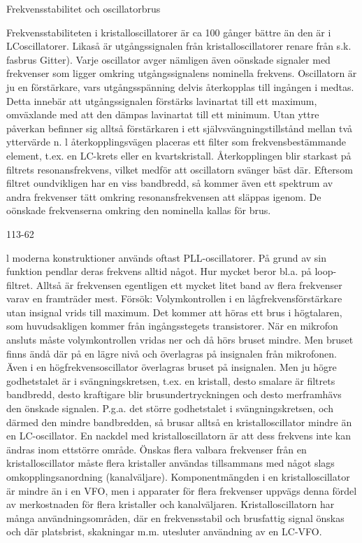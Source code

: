{{{Frekvensstabilitet och oscillatorbrus

Frekvensstabiliteten i kristalloscillatorer är
ca 100 gånger bättre än den är i LCoscillatorer. Likaså är utgångssignalen från
kristalloscillatorer renare från s.k. fasbrus
Gitter). Varje oscillator avger nämligen även
oönskade signaler med frekvenser som ligger omkring utgångssignalens nominella
frekvens.
Oscillatorn är ju en förstärkare, vars utgångsspänning delvis återkopplas till ingången i medtas. Detta innebär att utgångssignalen förstärks lavinartat till ett maximum, omväxlande med att den dämpas lavinartat till
ett minimum. Utan yttre påverkan befinner
sig alltså förstärkaren i ett självsvängningstillstånd mellan två yttervärde n. l återkopplingsvägen placeras ett filter som frekvensbestämmande element, t.ex. en LC-krets
eller en kvartskristall.
Återkopplingen blir starkast på filtrets
resonansfrekvens, vilket medför att oscillatorn svänger bäst där. Eftersom filtret oundvikligen har en viss bandbredd, så kommer
även ett spektrum av andra frekvenser tätt
omkring resonansfrekvensen att släppas
igenom. De oönskade frekvenserna omkring
den nominella kallas för brus.

113-62

l moderna konstruktioner används oftast
PLL-oscillatorer. På grund av sin funktion
pendlar deras frekvens alltid något. Hur
mycket beror bl.a. på loop-filtret. Alltså är
frekvensen egentligen ett mycket litet band
av flera frekvenser varav en framträder mest.
Försök:
Volymkontrollen i en lågfrekvensförstärkare
utan insignal vrids till maximum. Det kommer att höras ett brus i högtalaren, som
huvudsakligen kommer från ingångsstegets
transistorer. När en mikrofon ansluts måste
volymkontrollen vridas ner och då hörs bruset
mindre. Men bruset finns ändå där på en
lägre nivå och överlagras på insignalen från
mikrofonen.
Även i en högfrekvensoscillator överlagras bruset på insignalen. Men ju högre godhetstalet är i svängningskretsen, t.ex. en
kristall, desto smalare är filtrets bandbredd,
desto kraftigare blir brusundertryckningen
och desto merframhävs den önskade signalen. P.g.a. det större godhetstalet i svängningskretsen, och därmed den mindre bandbredden, så brusar alltså en kristalloscillator
mindre än en LC-oscillator.
En nackdel med kristalloscillatorn är att
dess frekvens inte kan ändras inom ettstörre
område. Önskas flera valbara frekvenser
från en kristalloscillator måste flera kristaller
användas tillsammans med något slags
omkopplingsanordning (kanalväljare).
Komponentmängden i en kristalloscillator
är mindre än i en VFO, men i apparater för
flera frekvenser uppvägs denna fördel av
merkostnaden för flera kristaller och kanalväljaren.
Kristalloscillatorn har många användningsområden, där en frekvensstabil och
brusfattig signal önskas och där platsbrist,
skakningar m.m. utesluter användning av en
LC-VFO.

}}}
